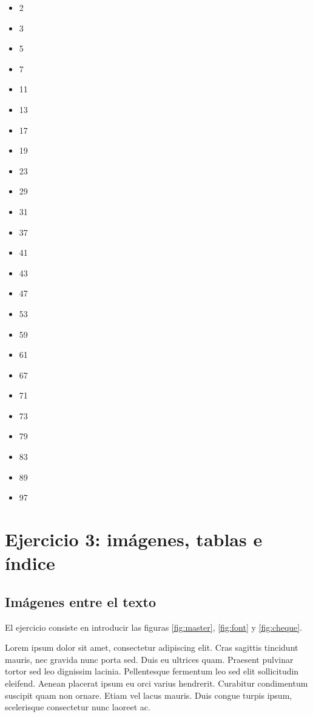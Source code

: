 \documentclass[a4paper,10pt]{article}
\theoremstyle{teorema}
\theoremstyle{plano}
\theoremstyle{titulo}
\begin{document}
\begin{multicols}{5}
\begin{itemize}
    \item 2
	\item 3
	\item 5
	\item 7
	\item 11
	\item 13
	\item 17
	\item 19
	\item 23
	\item 29
	\item 31
	\item 37
	\item 41
	\item 43
	\item 47
	\item 53
	\item 59
	\item 61
	\item 67
	\item 71
	\item 73
	\item 79
	\item 83
	\item 89
	\item 97
\end{itemize}
\end{multicols}

\section{Ejercicio 3: imágenes, tablas e índice}


\subsection{Imágenes entre el texto}

El ejercicio consiste en introducir las figuras \ref{fig:master}, \ref{fig:font} y \ref{fig:cheque}.

Lorem ipsum dolor sit amet, consectetur adipiscing elit. Cras sagittis tincidunt mauris, nec gravida nunc porta sed. Duis eu ultrices quam. Praesent pulvinar tortor sed leo dignissim lacinia. Pellentesque fermentum leo sed elit sollicitudin eleifend. Aenean placerat ipsum eu orci varius hendrerit. Curabitur condimentum suscipit quam non ornare. Etiam vel lacus mauris. Duis congue turpis ipsum, scelerisque consectetur nunc laoreet ac.
\end{document}
